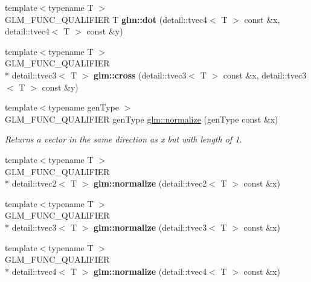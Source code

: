 \begin{DoxyCompactItemize}
\item 
\hypertarget{namespaceglm_af9645b5c6e227c570470967c4e716126}{{\footnotesize template$<$typename T $>$ }\\G\-L\-M\-\_\-\-F\-U\-N\-C\-\_\-\-Q\-U\-A\-L\-I\-F\-I\-E\-R T {\bfseries glm\-::dot} (detail\-::tvec4$<$ T $>$ const \&x, detail\-::tvec4$<$ T $>$ const \&y)}\label{namespaceglm_af9645b5c6e227c570470967c4e716126}

\item 
\hypertarget{namespaceglm_a83f3f9d7e3603fbfa78a26e2063bfa02}{{\footnotesize template$<$typename T $>$ }\\G\-L\-M\-\_\-\-F\-U\-N\-C\-\_\-\-Q\-U\-A\-L\-I\-F\-I\-E\-R \\*
detail\-::tvec3$<$ T $>$ {\bfseries glm\-::cross} (detail\-::tvec3$<$ T $>$ const \&x, detail\-::tvec3$<$ T $>$ const \&y)}\label{namespaceglm_a83f3f9d7e3603fbfa78a26e2063bfa02}

\item 
{\footnotesize template$<$typename gen\-Type $>$ }\\G\-L\-M\-\_\-\-F\-U\-N\-C\-\_\-\-Q\-U\-A\-L\-I\-F\-I\-E\-R gen\-Type \hyperlink{group__core__func__geometric_ga68b931c228750eeba844c273c54ca43d}{glm\-::normalize} (gen\-Type const \&x)
\begin{DoxyCompactList}\small\item\em Returns a vector in the same direction as x but with length of 1. \end{DoxyCompactList}\item 
\hypertarget{namespaceglm_a062d04793a570e36f1d76fb798b5d271}{{\footnotesize template$<$typename T $>$ }\\G\-L\-M\-\_\-\-F\-U\-N\-C\-\_\-\-Q\-U\-A\-L\-I\-F\-I\-E\-R \\*
detail\-::tvec2$<$ T $>$ {\bfseries glm\-::normalize} (detail\-::tvec2$<$ T $>$ const \&x)}\label{namespaceglm_a062d04793a570e36f1d76fb798b5d271}

\item 
\hypertarget{namespaceglm_a1f6e6247e73865728a13fa80190e394d}{{\footnotesize template$<$typename T $>$ }\\G\-L\-M\-\_\-\-F\-U\-N\-C\-\_\-\-Q\-U\-A\-L\-I\-F\-I\-E\-R \\*
detail\-::tvec3$<$ T $>$ {\bfseries glm\-::normalize} (detail\-::tvec3$<$ T $>$ const \&x)}\label{namespaceglm_a1f6e6247e73865728a13fa80190e394d}

\item 
\hypertarget{namespaceglm_abab14dd2c2e10451bd4fa85f2e291bfe}{{\footnotesize template$<$typename T $>$ }\\G\-L\-M\-\_\-\-F\-U\-N\-C\-\_\-\-Q\-U\-A\-L\-I\-F\-I\-E\-R \\*
detail\-::tvec4$<$ T $>$ {\bfseries glm\-::normalize} (detail\-::tvec4$<$ T $>$ const \&x)}\label{namespaceglm_abab14dd2c2e10451bd4fa85f2e291bfe}


\end{DoxyCompactItemize}
